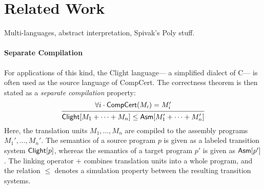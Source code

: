 \documentclass[acmsmall,review,anonymous]{acmart}\settopmatter{printfolios=true,printccs=false,printacmref=false}
\begin{document}



\section{Related Work} %

Multi-languages,
abstract interpretation,
Spivak's Poly stuff.

\paragraph{Separate Compilation} %

For applications of this kind,
the Clight language---%
a simplified dialect of C---%
is often used as the source language of CompCert.
The correctness theorem is then stated as
a \emph{separate compilation} \cite{sepcompcert} property:
\begin{equation} \label{eqn:scc}
  \begin{prooftree}
    \hypo{\forall i \cdot \kw{CompCert}(M_i) = M_i'}
    \infer1{\kw{Clight}[M_1 + \cdots + M_n]
      \le \kw{Asm}[M_1' + \cdots + M_n']}
  \end{prooftree}
\end{equation}
Here,
the translation units $M_1, \ldots, M_n$
are compiled to the assembly programs $M_1', \ldots, M_n'$.
The semantics of a source program $p$
is given as a labeled transition system $ \mathsf{Clight} [p]$,
whereas the semantics of a target program $p'$
is given as $ \mathsf{Asm} [p']$.
The linking operator $+$
combines translation units into a whole program,
and the relation $\le$ denotes a simulation property
between the resulting transition systems.
\end{document}
